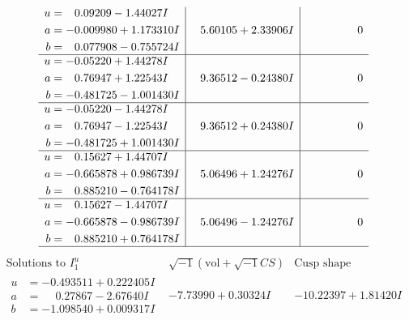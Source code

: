 \documentclass[1p]{elsarticle_modified}
\theoremstyle{definition}
\newcommand{\I}{\sqrt{-1}}
\begin{document}
$$\begin{array}{c|c|c}
\begin{aligned}
u &= \phantom{-}0.09209 - 1.44027 I \\
a &= -0.009980 + 1.173310 I \\
b &= \phantom{-}0.077908 - 0.755724 I\end{aligned}
 & \phantom{-}5.60105 + 2.33906 I & \phantom{-0.000000 } 0 \\ \hline\begin{aligned}
u &= -0.05220 + 1.44278 I \\
a &= \phantom{-}0.76947 + 1.22543 I \\
b &= -0.481725 - 1.001430 I\end{aligned}
 & \phantom{-}9.36512 - 0.24380 I & \phantom{-0.000000 } 0 \\ \hline\begin{aligned}
u &= -0.05220 - 1.44278 I \\
a &= \phantom{-}0.76947 - 1.22543 I \\
b &= -0.481725 + 1.001430 I\end{aligned}
 & \phantom{-}9.36512 + 0.24380 I & \phantom{-0.000000 } 0 \\ \hline\begin{aligned}
u &= \phantom{-}0.15627 + 1.44707 I \\
a &= -0.665878 + 0.986739 I \\
b &= \phantom{-}0.885210 - 0.764178 I\end{aligned}
 & \phantom{-}5.06496 + 1.24276 I & \phantom{-0.000000 } 0 \\ \hline\begin{aligned}
u &= \phantom{-}0.15627 - 1.44707 I \\
a &= -0.665878 - 0.986739 I \\
b &= \phantom{-}0.885210 + 0.764178 I\end{aligned}
 & \phantom{-}5.06496 - 1.24276 I & \phantom{-0.000000 } 0\\
 \hline 
 \end{array}$$\newpage$$\begin{array}{c|c|c}  
\text{Solutions to }I^u_{1}& \I (\text{vol} + \sqrt{-1}CS) & \text{Cusp shape}\\
 \hline 
\begin{aligned}
u &= -0.493511 + 0.222405 I \\
a &= \phantom{-}0.27867 - 2.67640 I \\
b &= -1.098540 + 0.009317 I\end{aligned}
 & -7.73990 + 0.30324 I & -10.22397 + 1.81420 I \\ \hline\begin{aligned}

\end{aligned}
\end{array}$$
\end{document}

